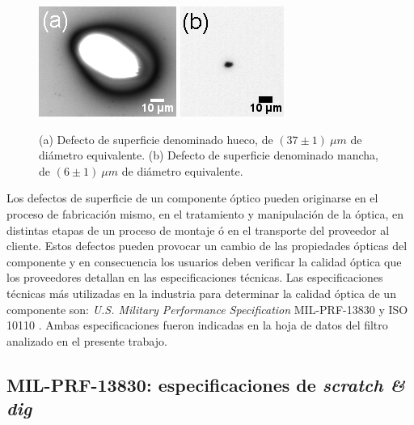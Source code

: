 \begin{figure}[H]
\hfill%
\includegraphics[scale=1.0]{Figs/cuantificaciondefectos/hueco_cel_112.png}
\hfill%
\includegraphics[scale=1.0]{Figs/cuantificaciondefectos/mancha_inicio.png}
\hfill%
\hfill%
\caption{(a) Defecto de superficie denominado hueco, de $(37 \pm 1)~\mu m$ de diámetro equivalente. (b) Defecto de superficie denominado mancha, de $(6 \pm 1)~\mu m$ de diámetro equivalente.}
\label{fig:defectos}
\end{figure}

Los defectos de superficie de un componente óptico pueden originarse en el proceso de fabricación mismo, en el tratamiento y manipulación de la óptica, en distintas etapas de un proceso de montaje ó en el transporte del proveedor al cliente. Estos defectos pueden provocar un cambio de las propiedades ópticas del componente y en consecuencia los usuarios deben verificar la calidad óptica que los proveedores detallan en las especificaciones técnicas. Las especificaciones técnicas más utilizadas en la industria para determinar la calidad óptica de un componente son:  \textit{U.S. Military Performance Specification} MIL-PRF-13830 \cite{milprf} y ISO 10110 \cite{iso10110}. Ambas especificaciones fueron indicadas en la hoja de datos del filtro analizado en el presente trabajo.

\singlespacing
\subsection{MIL-PRF-13830: especificaciones de \textit{scratch \& dig}}
\label{sec:scanddig}

